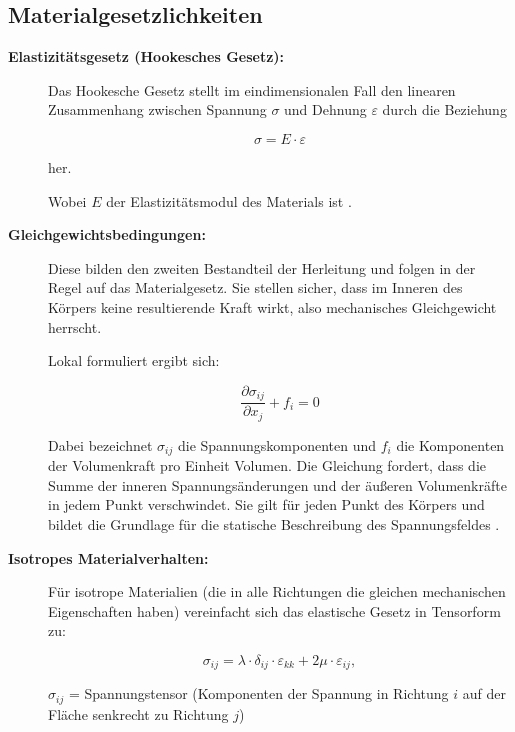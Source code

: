 \subsection{Materialgesetzlichkeiten}
\begin{description}	
	\item[\textbf{Elastizitätsgesetz (Hookesches Gesetz):}] Das Hookesche Gesetz stellt im eindimensionalen Fall den linearen Zusammenhang zwischen Spannung $\sigma$ und Dehnung $\varepsilon$ durch die Beziehung 
	
	\begin{equation}
		\sigma = 
		E \cdot \varepsilon
	\end{equation}
	 
	 her.
	
	 Wobei $E$ der Elastizitätsmodul des Materials ist \cite{elastomechanik:Kontinuumsmechanik}.
	 
	 \item[\textbf{Gleichgewichtsbedingungen:}] Diese bilden den zweiten Bestandteil der Herleitung und folgen in der Regel auf das Materialgesetz. 
	 Sie stellen sicher, dass im Inneren des Körpers keine resultierende Kraft wirkt, also mechanisches Gleichgewicht herrscht.
	 
	 Lokal formuliert ergibt sich:

	 \begin{equation}
	 	\frac{\partial \sigma_{ij}}{\partial x_j} + f_i =
	 	0
	 \end{equation}
	
	 Dabei bezeichnet $\sigma_{ij}$ die Spannungskomponenten und $f_i$ die Komponenten der Volumenkraft pro Einheit Volumen. 
	 Die Gleichung fordert, dass die Summe der inneren Spannungsänderungen und der äußeren Volumenkräfte in jedem Punkt verschwindet. Sie gilt für jeden Punkt des Körpers und bildet die Grundlage für die statische Beschreibung des Spannungsfeldes \cite{elastomechanik:Grundlagen der Elastizitaetstheorie}.
	 
	 \item[\textbf{Isotropes Materialverhalten:}] Für isotrope Materialien (die in alle Richtungen die gleichen mechanischen Eigenschaften haben) vereinfacht sich das elastische Gesetz in Tensorform zu:
	 
	 \begin{equation}
	 	\sigma_{ij} = 
	 	\lambda \cdot \delta_{ij} \cdot \varepsilon_{kk} + 2\mu \cdot \varepsilon_{ij},
	 \end{equation}

	$\sigma_{ij}$ = Spannungstensor (Komponenten der Spannung in Richtung $i$ auf der Fläche senkrecht zu Richtung $j$)
	

\end{description}
